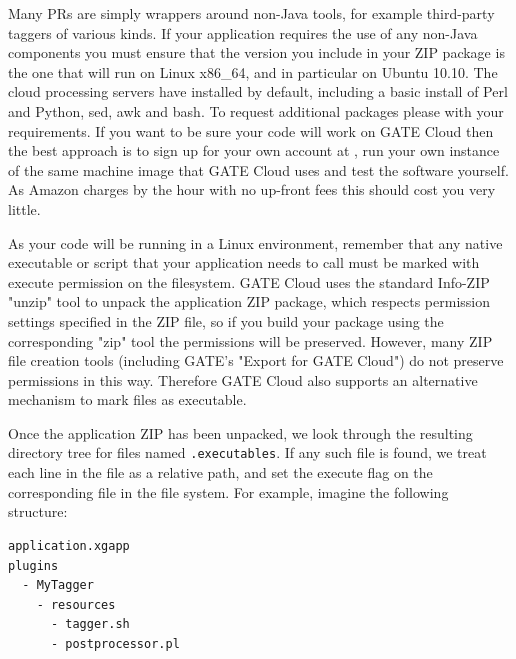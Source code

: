 Many PRs are simply wrappers around non-Java tools, for example third-party
taggers of various kinds.  If your application requires the use of any non-Java
components you must ensure that the version you include in your ZIP package is
the one that will run on Linux x86\_64, and in particular on Ubuntu 10.10.  The
cloud processing servers have
installed by default, including a basic install of Perl and Python, sed, awk
and bash.  To request additional packages please 
 with
your requirements.  If you want to be sure your code will work on GATE Cloud
then the best approach is to sign up for your own account at
, run your own instance of the
{same machine image} that GATE Cloud uses and test the software yourself.  
As Amazon charges by the hour with no up-front fees this should cost you very 
little.

As your code will be running in a Linux environment, remember that any native
executable or script that your application needs to call must be marked with
execute permission on the filesystem.  GATE Cloud uses the standard Info-ZIP
"unzip" tool to unpack the application ZIP package, which respects permission
settings specified in the ZIP file, so if you build your package using the
corresponding "zip" tool the permissions will be preserved.  However, many ZIP
file creation tools (including GATE's "Export for GATE Cloud") do not preserve
permissions in this way.  Therefore GATE Cloud also supports an alternative
mechanism to mark files as executable.

Once the application ZIP has been unpacked, we look through the resulting
directory tree for files named \verb^.executables^.  If any such file is found,
we treat each line in the file as a relative path, and set the execute flag on
the corresponding file in the file system.  For example, imagine the following
structure:

\begin{small}
\begin{verbatim}
application.xgapp
plugins
  - MyTagger
    - resources
      - tagger.sh
      - postprocessor.pl
\end{verbatim}
\end{small}

